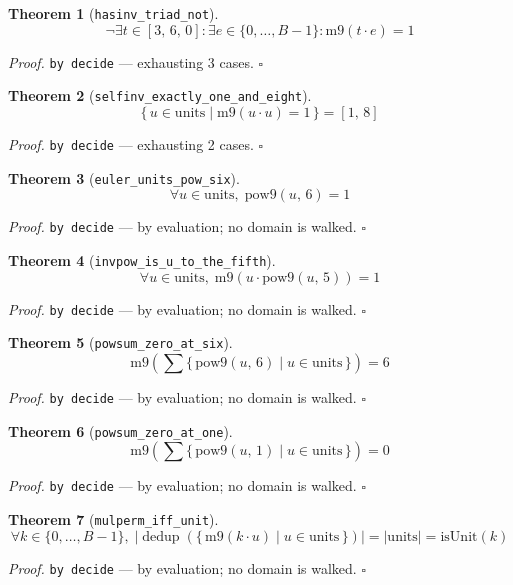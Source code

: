 \documentclass[11pt]{article}
\newtheorem{theorem}{Theorem}[section]
\begin{document}
\begin{theorem}[\texttt{hasinv\_triad\_not}]
\[ \lnot \exists t \in [3,\,6,\,0] : \exists e \in \{0,\dots,B-1\} : \mathrm{m9}\mathopen{}\left(t \cdot e\right) = 1 \]
\end{theorem}
\noindent\emph{Proof.} \texttt{by decide} --- exhausting 3 cases. \hfill$\square$

\begin{theorem}[\texttt{selfinv\_exactly\_one\_and\_eight}]
\[ \{\, u \in \mathrm{units} \mid \mathrm{m9}\mathopen{}\left(u \cdot u\right) = 1 \,\} = [1,\,8] \]
\end{theorem}
\noindent\emph{Proof.} \texttt{by decide} --- exhausting 2 cases. \hfill$\square$

\begin{theorem}[\texttt{euler\_units\_pow\_six}]
\[ \forall u \in \mathrm{units},\; \mathrm{pow9}\mathopen{}\left(u,\,6\right) = 1 \]
\end{theorem}
\noindent\emph{Proof.} \texttt{by decide} --- by evaluation; no domain is walked. \hfill$\square$

\begin{theorem}[\texttt{invpow\_is\_u\_to\_the\_fifth}]
\[ \forall u \in \mathrm{units},\; \mathrm{m9}\mathopen{}\left(u \cdot \mathrm{pow9}\mathopen{}\left(u,\,5\right)\right) = 1 \]
\end{theorem}
\noindent\emph{Proof.} \texttt{by decide} --- by evaluation; no domain is walked. \hfill$\square$

\begin{theorem}[\texttt{powsum\_zero\_at\_six}]
\[ \mathrm{m9}\mathopen{}\left(\sum \{\, \mathrm{pow9}\mathopen{}\left(u,\,6\right) \mid u \in \mathrm{units} \,\}\right) = 6 \]
\end{theorem}
\noindent\emph{Proof.} \texttt{by decide} --- by evaluation; no domain is walked. \hfill$\square$

\begin{theorem}[\texttt{powsum\_zero\_at\_one}]
\[ \mathrm{m9}\mathopen{}\left(\sum \{\, \mathrm{pow9}\mathopen{}\left(u,\,1\right) \mid u \in \mathrm{units} \,\}\right) = 0 \]
\end{theorem}
\noindent\emph{Proof.} \texttt{by decide} --- by evaluation; no domain is walked. \hfill$\square$

\begin{theorem}[\texttt{mulperm\_iff\_unit}]
\[ \forall k \in \{0,\dots,B-1\},\; \left|\operatorname{dedup}\left(\{\, \mathrm{m9}\mathopen{}\left(k \cdot u\right) \mid u \in \mathrm{units} \,\}\right)\right| = \left|\mathrm{units}\right| = \mathrm{isUnit}\mathopen{}\left(k\right) \]
\end{theorem}
\noindent\emph{Proof.} \texttt{by decide} --- by evaluation; no domain is walked. \hfill$\square$
\end{document}
